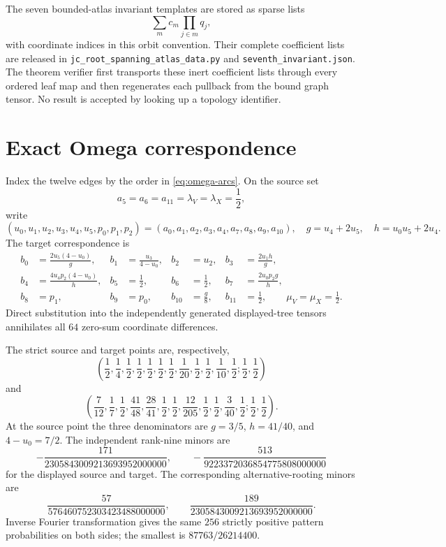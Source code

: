 \documentclass[11pt]{article}
\theoremstyle{remark}
\begin{document}
The seven bounded-atlas invariant templates are stored as sparse lists
\[
\sum_m c_m\prod_{j\in m}q_j,
\]
with coordinate indices in this orbit convention.  Their complete coefficient
lists are released in
\texttt{jc\_root\_spanning\_atlas\_data.py} and
\texttt{seventh\_invariant.json}.  The theorem verifier first transports
these inert coefficient lists through every ordered leaf map and then
regenerates each pullback from the bound graph tensor.  No result is accepted
by looking up a topology identifier.

\section{Exact Omega correspondence}\label{app:omega}

Index the twelve edges by the order in \eqref{eq:omega-arcs}.  On the source
set
\[
a_5=a_6=a_{11}=\lambda_V=\lambda_X=\frac12,
\]
write
\[
(u_0,u_1,u_2,u_3,u_4,u_5,p_0,p_1,p_2)
=(a_0,a_1,a_2,a_3,a_4,a_7,a_8,a_9,a_{10}),
\quad g=u_4+2u_5,\quad h=u_0u_5+2u_4.
\]
The target correspondence is
\begin{align*}
b_0&=\frac{2u_5(4-u_0)}g,& b_1&=\frac {u_3}{4-u_0},&b_2&=u_2,
&b_3&=\frac{2u_1h}g,\\
b_4&=\frac{4u_4p_2(4-u_0)}h,&b_5&=\frac12,&b_6&=\frac12,
&b_7&=\frac{2u_0p_2g}h,\\
b_8&=p_1,&b_9&=p_0,&b_{10}&=\frac g8,&b_{11}&=\frac12,
\qquad \mu_V=\mu_X=\frac12.
\end{align*}
Direct substitution into the independently generated displayed-tree tensors
annihilates all $64$ zero-sum coordinate differences.

The strict source and target points are, respectively,
\[
\left(\frac12,\frac14,\frac12,\frac12,\frac12,\frac12,\frac12,
\frac1{20},\frac12,\frac12,\frac1{10},\frac12;\frac12,\frac12\right)
\]
and
\[
\left(\frac7{12},\frac17,\frac12,\frac{41}{48},\frac{28}{41},
\frac12,\frac12,\frac{12}{205},\frac12,\frac12,\frac3{40},
\frac12;\frac12,\frac12\right).
\]
At the source point the three denominators are
$g=3/5$, $h=41/40$, and $4-u_0=7/2$.  The independent rank-nine minors are
\[
-\frac{171}{2305843009213693952000000},\qquad
-\frac{513}{9223372036854775808000000}
\]
for the displayed source and target.  The corresponding alternative-rooting
minors are
\[
\frac{57}{576460752303423488000000},\qquad
\frac{189}{2305843009213693952000000}.
\]
Inverse Fourier transformation gives the same $256$ strictly positive
pattern probabilities on both sides; the smallest is
$87763/26214400$.
\end{document}
